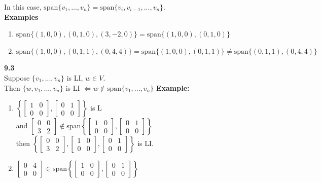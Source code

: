 \documentclass[]{article}
\begin{document}
		In this case, $\text{span}\{v_1,...,v_n\}=\text{span}\{v_i,v_{i-1},...,v_n\}$.\\
		{\bf Examples}
		\begin{enumerate}
			\item $\text{span}\{(1,0,0),(0,1,0),(3,-2,0)\}=\text{span}\{(1,0,0),(0,1,0)\}$
			\item $\text{span}\{(1,0,0),(0,1,1),(0,4,4)\}=\text{span}\{(1,0,0),(0,1,1)\}\ne\text{span}\{(0,1,1),(0,4,4)\}$
		\end{enumerate}
		\large{\bf 9.3}\\
		\normalsize
		Suppose $\{v_1,...,v_n\}$ is LI, $w\in V$.\\
		Then $\{ w, v_1,...,v_n \}$ is LI $\iff w\notin\text{span}\{v_1,...,v_n\}$
		{\bf Example:}
		\begin{enumerate}
			\item $\left\{\begin{bmatrix}{1}&{0}\\{0}&{0}\end{bmatrix},\begin{bmatrix}{0}&{1}\\{0}&{0}\end{bmatrix}\right\}$ is L\\
			and $\begin{bmatrix}{0}&{0}\\{3}&{2}\end{bmatrix}\notin\text{span}\left\{\begin{bmatrix}{1}&{0}\\{0}&{0}\end{bmatrix},\begin{bmatrix}{0}&{1}\\{0}&{0}\end{bmatrix}\right\}$\\
			then $\left\{\begin{bmatrix}{0}&{0}\\{3}&{2}\end{bmatrix},\begin{bmatrix}{1}&{0}\\{0}&{0}\end{bmatrix},\begin{bmatrix}{0}&{1}\\{0}&{0}\end{bmatrix}\right\}$ is LI.\\
			\item $\begin{bmatrix}{0}&{4}\\{0}&{0}\end{bmatrix}\in\text{span}\left\{\begin{bmatrix}{1}&{0}\\{0}&{0}\end{bmatrix},\begin{bmatrix}{0}&{1}\\{0}&{0}\end{bmatrix}\right\}$\\

\end{enumerate}
\end{document}
